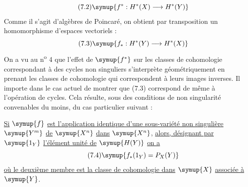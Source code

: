 \begin{equation}\tag{7.2}
  \symup{f^{*}:H^{*}(X)\longrightarrow H^{*}(Y)}
\end{equation}
Comme il s'agit d'algèbres de Poincaré, on obtient par transposition un
homomorphisme d'espaces vectoriels :
\begin{equation}\tag{7.3}
  \symup{f_{*}:H^{*}(Y)\longrightarrow H^{*}(X)}
\end{equation}
On a vu au n\textsuperscript{o} 4 que l'effet de $\symup{f^{*}}$ sur les classes de
cohomologie correspondant à des cycles non singuliers s'interprète
géométriquement en prenant les classes de cohomologie qui correspondent à leurs
images inverses. Il importe dans le cas actuel de montrer que (7.3) correspond
de même à l'opération  de cycles. Cela résulte, sous des
conditions de non singularité convenables du moins, du cas particulier suivant :

 \uline{Si} $\symup{f}$ \uline{est l'application identique d'une sous-variété non
singulière} $\symup{Y^{m}}$ \uline{de} $\symup{X^{n}}$ \uline{dans} $\symup{X^{n}}$, \uline{alors, désignant par} $\symup{1_Y}$
\uline{l'élément unité de} $\symup{H(Y)}$ \uline{on a}
\begin{equation}\tag{7.4}
  \symup{f_{*}(1_Y)=P_X(Y)}
\end{equation}
\uline{où le deuxième membre est la classe de cohomologie dans} $\symup{X}$ \uline{associée à} $\symup{Y}$.


